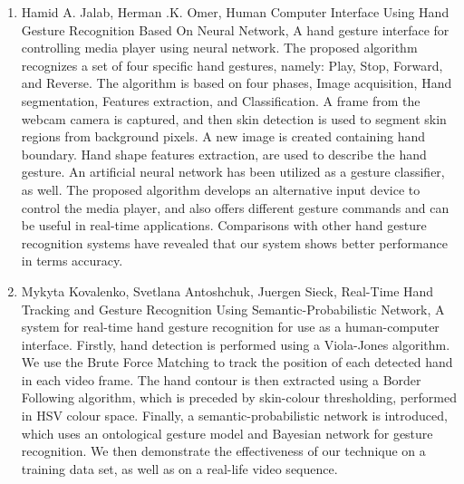 \documentclass[11pt]{report}
\begin{document}
\begin{enumerate}
    \item Hamid A. Jalab, Herman .K. Omer, Human Computer Interface Using Hand Gesture Recognition Based On Neural Network, A hand gesture interface for controlling media player using neural network. The proposed algorithm recognizes a set of four specific hand gestures, namely: Play, Stop, Forward, and Reverse. The algorithm is based on four phases, Image acquisition, Hand segmentation, Features extraction, and Classification. A frame from the webcam camera is captured, and then skin detection is used to segment skin regions from background pixels. A new image is created containing hand boundary. Hand shape features extraction, are used to describe the hand gesture. An artificial neural network has been utilized as a gesture classifier, as well. The proposed algorithm develops an alternative input device to control the media player, and also offers different gesture commands and can be useful in real-time applications. Comparisons with other hand gesture recognition systems have revealed that our system shows better performance in terms accuracy.\cite{8}
    
    \item Mykyta Kovalenko, Svetlana Antoshchuk, Juergen Sieck, Real-Time Hand Tracking and Gesture Recognition Using Semantic-Probabilistic Network, A system for real-time hand gesture  recognition  for use  as  a  human-computer  interface.  Firstly,   hand   detection   is   performed   using   a   Viola-Jones   algorithm.  We  use  the  Brute Force Matching  to  track  the  position  of  each  detected  hand  in  each  video  frame.  The  hand  contour  is  then  extracted  using  a  Border  Following  algorithm,  which  is  preceded  by  skin-colour   thresholding, performed   in   HSV   colour   space.   Finally,  a  semantic-probabilistic  network  is  introduced,  which  uses  an  ontological  gesture  model  and  Bayesian  network  for  gesture  recognition.  We  then  demonstrate  the  effectiveness  of  our  technique  on  a  training  data  set,  as  well  as  on a  real-life video sequence.\cite{9}
    

\end{enumerate}
\end{document}
